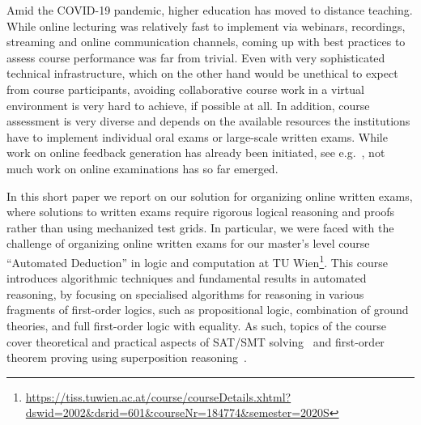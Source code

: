 Amid the COVID-19 pandemic, higher education has moved to distance
teaching. While online lecturing was relatively fast to implement via
webinars, recordings,  streaming and online communication channels,
coming up with best practices to assess course performance was far
from trivial. Even with very sophisticated technical infrastructure,
which on the other hand would be unethical to expect from course
participants,  avoiding collaborative course work in a virtual
environment is very hard to achieve, if possible at all.
In addition, course assessment is very diverse and depends on the
available resources the  institutions have to implement individual oral
exams or large-scale written exams. While work on
online feedback generation has already been initiated, see
e.g.~\cite{Zuleger18,Wang18}, 
not much work on online examinations has so far emerged. 

In this short paper we report on our solution for organizing online
written exams, where solutions to written exams require rigorous
logical reasoning and proofs rather than using mechanized test grids.
In particular, we were faced with the challenge of organizing online
written exams for our master's level course ``Automated
Deduction'' in logic and computation at TU
Wien\footnote{\url{https://tiss.tuwien.ac.at/course/courseDetails.xhtml?dswid=2002\&dsrid=601\&courseNr=184774\&semester=2020S}}.
This course introduces algorithmic techniques and fundamental results
in automated reasoning, by focusing on specialised algorithms for
reasoning in various fragments of first-order logics, such as
propositional logic, combination of ground theories, and full
first-order logic with equality.
As such, topics of the course cover theoretical and practical
aspects of SAT/SMT solving~\cite{DPLL,Tinelli02,DPLLT} and first-order theorem proving using
superposition reasoning~\cite{Ganzinger01,Rubio01,Vampire13}.

